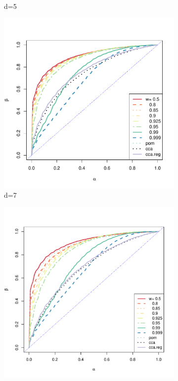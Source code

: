 \documentclass[12pt,oneside,final]{thesis}\usepackage[]{graphicx}\usepackage[]{color}
\begin{document}
\begin{figure}
\begin{subfigure}[b]{0.5\textwidth}
                \caption{d=5}
                \label{fig:ROC-d-5}
        \end{subfigure}      
        \begin{subfigure}[b]{0.47\textwidth}             
               \includegraphics[width=\textwidth]{ROC-d-7.pdf}
                \caption{d=7}
                \label{fig:ROC-d-7}
        \end{subfigure}          
               \begin{subfigure}[b]{0.47\textwidth}
                \centering
               \includegraphics[width=\textwidth]{ROC-d-10.pdf}

\end{subfigure}
\end{figure}
\end{document}
